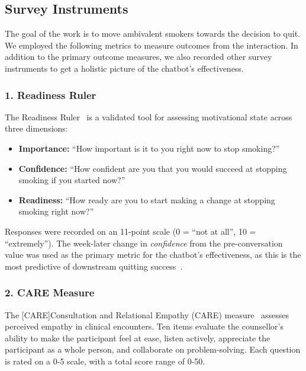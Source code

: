 \subsection{Survey Instruments}
\label{subsec:survey-instruments}

The goal of the work is to move ambivalent smokers towards the decision to quit. We employed the following metrics to measure outcomes from the interaction. In addition to the primary outcome measures, we also recorded other survey instruments to get a holistic picture of the chatbot's effectiveness.

\subsubsection{1. Readiness Ruler}
\label{subsec:readiness-ruler}
The Readiness Ruler~\citep{rollnick1992development} is a validated tool for assessing motivational state across three dimensions:
\begin{itemize}
    \item \textbf{Importance:} ``How important is it to you right now to stop smoking?''
    \item \textbf{Confidence:} ``How confident are you that you would succeed at stopping smoking if you started now?''
    \item \textbf{Readiness:} ``How ready are you to start making a change at stopping smoking right now?''
\end{itemize}
Responses were recorded on an 11-point scale (0 = ``not at all'', 10 = ``extremely''). The week-later change in \emph{confidence} from the pre-conversation value was used as the primary metric for the chatbot's effectiveness, as this is the most predictive
of downstream quitting success~\cite{Gwaltney2009-wj,Abar2013}.

\subsubsection{2. CARE Measure}
\label{subsec:care}
The [CARE]Consultation and Relational Empathy (CARE) measure~\citep{mercer2004consultation,bikker2015measuring} assesses perceived empathy in clinical encounters. Ten items evaluate the counsellor's ability to make the participant feel at ease, listen actively, appreciate the participant as a whole person, and collaborate on problem-solving. Each question is rated on a 0-5 scale, with a total score range of 0-50.

